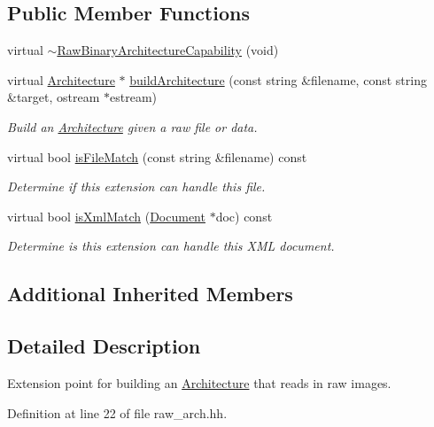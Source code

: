 \subsection*{Public Member Functions}
\begin{DoxyCompactItemize}
\item 
virtual \mbox{\hyperlink{class_raw_binary_architecture_capability_af65d8ba186b5cf0a9906b1ddc15657d7}{$\sim$\+Raw\+Binary\+Architecture\+Capability}} (void)
\item 
virtual \mbox{\hyperlink{class_architecture}{Architecture}} $\ast$ \mbox{\hyperlink{class_raw_binary_architecture_capability_a69e87f1ba9b72c89b74981b168074062}{build\+Architecture}} (const string \&filename, const string \&target, ostream $\ast$estream)
\begin{DoxyCompactList}\small\item\em Build an \mbox{\hyperlink{class_architecture}{Architecture}} given a raw file or data. \end{DoxyCompactList}\item 
virtual bool \mbox{\hyperlink{class_raw_binary_architecture_capability_aef426ad157b2f6b9130159322e2a2465}{is\+File\+Match}} (const string \&filename) const
\begin{DoxyCompactList}\small\item\em Determine if this extension can handle this file. \end{DoxyCompactList}\item 
virtual bool \mbox{\hyperlink{class_raw_binary_architecture_capability_ad26a1a35fec33c5952a3f499dc0e43db}{is\+Xml\+Match}} (\mbox{\hyperlink{class_document}{Document}} $\ast$doc) const
\begin{DoxyCompactList}\small\item\em Determine is this extension can handle this X\+ML document. \end{DoxyCompactList}\end{DoxyCompactItemize}
\subsection*{Additional Inherited Members}


\subsection{Detailed Description}
Extension point for building an \mbox{\hyperlink{class_architecture}{Architecture}} that reads in raw images. 

Definition at line 22 of file raw\+\_\+arch.\+hh.



